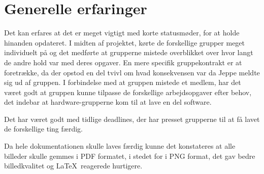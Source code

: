 \section{Generelle erfaringer}

Det kan erfares at det er meget vigtigt med korte statusmøder, for at holde hinanden opdateret. I midten af projektet, kørte de forskellige grupper meget individuelt på og det medførte at grupperne mistede overblikket over hvor langt de andre hold var med deres opgaver. En mere specifik gruppekontrakt er at foretrække, da der opstod en del tvivl om hvad konsekvensen var da Jeppe meldte sig ud af gruppen. I forbindelse med at gruppen mistede et medlem, har det været godt at gruppen kunne tilpasse de forskellige arbejdsopgaver efter behov, det indebar at hardware-grupperne kom til at lave en del software. 

Det har været godt med tidlige deadlines, der har presset grupperne til at få lavet de forskellige ting færdig.

Da hele dokumentationen skulle laves færdig  kunne det konstateres at alle billeder skulle gemmes i PDF formatet, i stedet for i PNG format, det gav bedre billedkvalitet og \LaTeX\ reagerede hurtigere.
